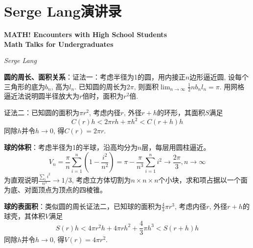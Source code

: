 \chapter{Serge Lang演讲录}

\Large\textbf{MATH! Encounters with High School Students}\\
\Large\textbf{Math Talks for Undergraduates}
\par \emph{Serge Lang} \normalsize

\textbf{圆的周长、面积关系}：证法一：考虑半径为1的圆，用内接正$n$边形逼近圆, 设每个三角形的底为$b_n$, 高为$l_n$. 已知圆的周长为$2\pi$, 则面积$\lim_{n\to \infty} \frac{1}{2} nb_nl_n = \pi$. 用网格逼近法说明圆半径放大为$r$倍时，面积为$r^2$倍.

证法二：已知圆的面积为$\pi r^2$, 考虑内径$r$, 外径$r+h$的环形，其面积$S$满足
\begin{equation}
    C(r)h < 2\pi rh + \pi h^2 < C(r+h)h
\end{equation}
同除$h$并令$h\to 0$, 得$C(r)=2\pi r$. 

\textbf{球的体积}：考虑半径为1的半球，沿高均分为$n$层，每层用圆柱逼近。
\begin{equation}
V_n = \frac{\pi}{n} \sum_{i=1}^n \left(1-\frac{i^2}{n^2}\right) = \pi - \frac{\pi}{n^3} \sum_{i=1}^n i^2 \to \frac{2\pi}{3}, n\to \infty
\end{equation}
为直观说明$\frac{\sum_i i^2}{n^3} \to 1/3$, 考虑立方体切割为$n\times n\times n$个小块，求和项占据以一个面为底、对面顶点为顶点的四棱锥。

\textbf{球的表面积}：类似圆的周长证法二，已知球的面积为$\frac{4}{3}\pi r^3$, 考虑内径$r$, 外径$r+h$的球壳，其体积$V$满足
\begin{equation}
    S(r)h < 4\pi r^2h+4\pi rh^2+\frac{4}{3}\pi h^3  < S(r+h)h
\end{equation}
同除$h$并令$h\to 0$, 得$V(r)=4\pi r^2$. 
